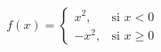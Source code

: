 \documentclass[preview]{standalone}
\begin{document}
\begin{align*}
f(x) = \begin{cases} x^2, & \text{si } x < 0 \\ -x^2, & \text{si } x \geq 0 \end{cases}
\end{align*}
\end{document}
